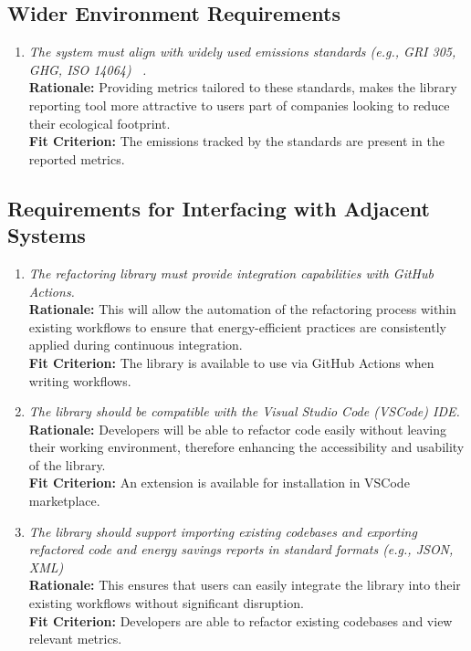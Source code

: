 \documentclass[12pt]{article}
\begin{document}
\subsection{Wider Environment Requirements}
\begin{enumerate}[label=OER-WE \arabic*., wide=0pt, leftmargin=*]
	\item \emph{The system must align with widely used emissions standards (e.g., GRI 305, GHG, ISO 14064) ~\citep{GHG,ISO14064,GRI305}.}\\
    {\bf Rationale:} Providing metrics tailored to these standards, makes the library reporting tool more attractive to users part of companies looking to reduce their ecological footprint. \\
    {\bf Fit Criterion:} The emissions tracked by the standards are present in the reported metrics.  
\end{enumerate}

\subsection{Requirements for Interfacing with Adjacent Systems}
\begin{enumerate}[label=OER-IAS \arabic*., wide=0pt, leftmargin=*]
	\item \emph{The refactoring library must provide integration capabilities with GitHub Actions.}\\
    {\bf Rationale:} This will allow the automation of the refactoring process within existing workflows to ensure that energy-efficient practices are consistently applied during continuous integration.\\
    {\bf Fit Criterion:} The library is available to use via GitHub Actions when writing workflows.
  \item \emph{The library should be compatible with the Visual Studio Code (VSCode) IDE.}\\
    {\bf Rationale:} Developers will be able to refactor code easily without leaving their working environment, therefore enhancing the accessibility and usability of the library.\\
    {\bf Fit Criterion:} An extension is available for installation in VSCode marketplace.
  \item \emph{The library should support importing existing codebases and exporting refactored code and energy savings reports in standard formats (e.g., JSON, XML)}\\
    {\bf Rationale:} This ensures that users can easily integrate the library into their existing workflows without significant disruption.\\
    {\bf Fit Criterion:} Developers are able to refactor existing codebases and view relevant metrics.
\end{enumerate}
\end{document}
